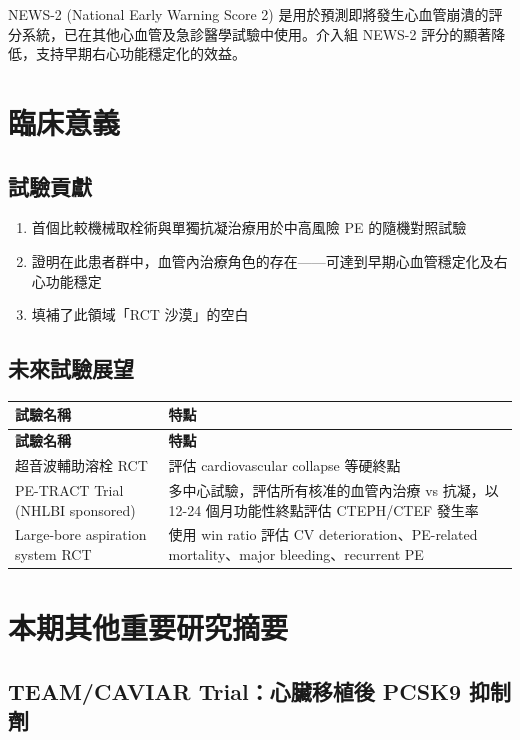 \documentclass[12pt,a4paper]{article}
\newcommand{\note}[1]{
    \par
    \noindent
    \begin{tcolorbox}[
        colback=emergency_blue!5!white,
        colframe=emergency_blue,
        title=\textbf{重點提醒},
        fonttitle=\bfseries,
        boxrule=0.5pt,
        arc=3pt,
        left=6pt,
        right=6pt,
        top=6pt,
        bottom=6pt
    ]
    #1
    \end{tcolorbox}
}
\begin{document}
\note{
NEWS-2 (National Early Warning Score 2) 是用於預測即將發生心血管崩潰的評分系統，已在其他心血管及急診醫學試驗中使用。介入組 NEWS-2 評分的顯著降低，支持早期右心功能穩定化的效益。
}

\section{臨床意義}

\subsection{試驗貢獻}
\begin{enumerate}
    \item 首個比較機械取栓術與單獨抗凝治療用於中高風險 PE 的隨機對照試驗
    \item 證明在此患者群中，血管內治療角色的存在——可達到早期心血管穩定化及右心功能穩定
    \item 填補了此領域「RCT 沙漠」的空白
\end{enumerate}

\subsection{未來試驗展望}

\begin{longtable}{p{5cm}p{9cm}}
\toprule
\textbf{試驗名稱} & \textbf{特點} \\
\midrule
\endfirsthead
\toprule
\textbf{試驗名稱} & \textbf{特點} \\
\midrule
\endhead
超音波輔助溶栓 RCT & 評估 cardiovascular collapse 等硬終點 \\
\midrule
PE-TRACT Trial (NHLBI sponsored) & 多中心試驗，評估所有核准的血管內治療 vs 抗凝，以 12-24 個月功能性終點評估 CTEPH/CTEF 發生率 \\
\midrule
Large-bore aspiration system RCT & 使用 win ratio 評估 CV deterioration、PE-related mortality、major bleeding、recurrent PE \\
\bottomrule
\end{longtable}

\section{本期其他重要研究摘要}

\subsection{TEAM/CAVIAR Trial：心臟移植後 PCSK9 抑制劑}
\end{document}
